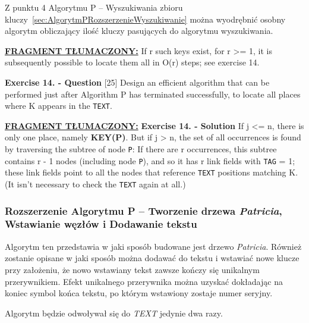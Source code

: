 	Z punktu 4 Algorytmu P -- Wyszukiwania zbioru kluczy~\ref{sec:AlgorytmPRozszerzenieWyszukiwanie} można wyodrębnić osobny algorytm obliczający ilość kluczy pasujących do algorytmu wyszukiwania. 
	
	\ifsourcematerial
	\begin{displayquote}
		\color{ao(english)}
		\underline{\textbf{FRAGMENT TŁUMACZONY:}} \newline
		If r such keys exist, for r >= 1, it is subsequently possible to locate
		them all in O(r) steps; see exercise 14.
		
		\textbf{Exercise 14. - Question} [25] Design an efficient algorithm that can be performed just after Algorithm P has terminated successfully, to locate all places where K appears in the \texttt{TEXT}.
	\end{displayquote}
	\fi
	
	\ifsourcematerial
	\begin{displayquote}
		\color{ao(english)}
		\underline{\textbf{FRAGMENT TŁUMACZONY:}} \newline
		\textbf{Exercise 14. - Solution} If j <= n, there is only one place, namely \textbf{KEY(P)}. But if j > n, the set of all occurrences is found by traversing the subtree of node \texttt{P}: If there are r occurrences, this subtree contains r - 1 nodes (including node \texttt{P}), and so it has r link fields with \texttt{TAG} = 1; these link fields point to all the nodes that reference \texttt{TEXT} positions matching K. (It isn’t necessary to check the \texttt{TEXT} again at all.)
	\end{displayquote}
	\fi
	
	\subsubsection{Rozszerzenie Algorytmu P -- Tworzenie drzewa \emph{Patricia}, Wstawianie węzłów i Dodawanie tekstu}\label{sec:AlgorytmPRozszerzenieTworzenieWstawienieDodawanie}
	
	Algorytm ten przedstawia w jaki sposób budowane jest drzewo \emph{Patricia}. Również zostanie opisane w jaki sposób można dodawać do tekstu i wstawiać nowe klucze przy założeniu, że nowo wstawiany tekst zawsze kończy się unikalnym przerywnikiem. Efekt unikalnego przerywnika można uzyskać dokładając na koniec symbol końca tekstu, po którym wstawiony zostaje numer seryjny.
	
	Algorytm będzie odwoływał się do \emph{TEXT} jedynie dwa razy.
	
